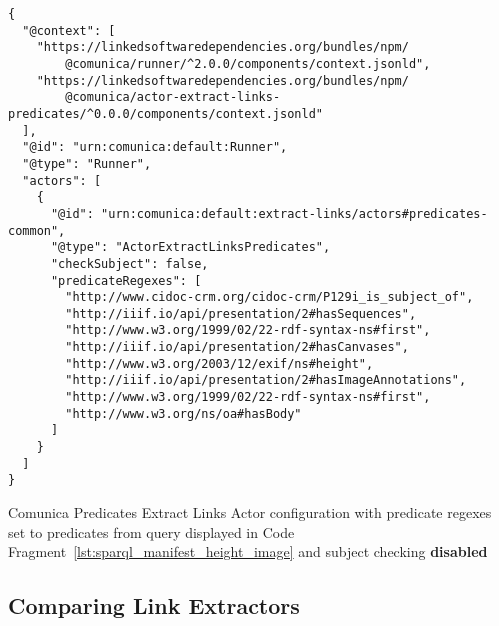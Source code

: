 \begin{listing}[htbp]
    \begin{verbatim}
{
  "@context": [
    "https://linkedsoftwaredependencies.org/bundles/npm/
        @comunica/runner/^2.0.0/components/context.jsonld",
    "https://linkedsoftwaredependencies.org/bundles/npm/
        @comunica/actor-extract-links-predicates/^0.0.0/components/context.jsonld"
  ],
  "@id": "urn:comunica:default:Runner",
  "@type": "Runner",
  "actors": [
    {
      "@id": "urn:comunica:default:extract-links/actors#predicates-common",
      "@type": "ActorExtractLinksPredicates",
      "checkSubject": false,
      "predicateRegexes": [
        "http://www.cidoc-crm.org/cidoc-crm/P129i_is_subject_of",
        "http://iiif.io/api/presentation/2#hasSequences",
        "http://www.w3.org/1999/02/22-rdf-syntax-ns#first",
        "http://iiif.io/api/presentation/2#hasCanvases",
        "http://www.w3.org/2003/12/exif/ns#height",
        "http://iiif.io/api/presentation/2#hasImageAnnotations",
        "http://www.w3.org/1999/02/22-rdf-syntax-ns#first",
        "http://www.w3.org/ns/oa#hasBody"
      ]
    }
  ]
}
    \end{verbatim}
    \caption{Comunica Predicates Extract Links Actor configuration with predicate regexes set to predicates from query displayed in Code Fragment~\ref{lst:sparql_manifest_height_image} and subject checking \textbf{disabled}}
    \label{lst:actor_config_regexes_subject_false}
\end{listing}

\subsection{Comparing Link Extractors}


